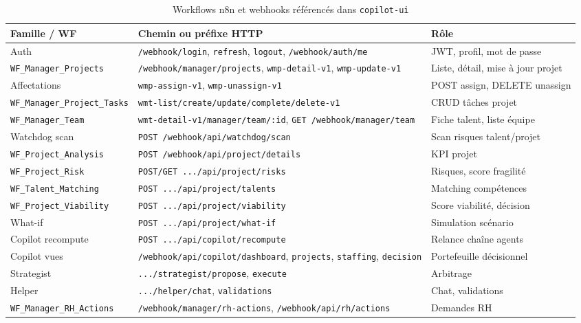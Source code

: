 \begin{table}[htbp]
\centering
\caption{Workflows n8n et webhooks référencés dans \texttt{copilot-ui}}
\label{tab:workflows-ch4}
\begin{tabular}{@{}p{2.5cm}p{4.8cm}p{5.7cm}@{}}
\toprule
\textbf{Famille / WF} & \textbf{Chemin ou préfixe HTTP} & \textbf{Rôle} \\
\midrule
Auth & \texttt{/webhook/login}, \texttt{refresh}, \texttt{logout}, \texttt{/webhook/auth/me} & JWT, profil, mot de passe \\
\texttt{WF\_Manager\_Projects} & \texttt{/webhook/manager/projects}, \texttt{wmp-detail-v1}, \texttt{wmp-update-v1} & Liste, détail, mise à jour projet \\
Affectations & \texttt{wmp-assign-v1}, \texttt{wmp-unassign-v1} & POST assign, DELETE unassign \\
\texttt{WF\_Manager\_Project\_Tasks} & \texttt{wmt-list/create/update/complete/delete-v1} & CRUD tâches projet \\
\texttt{WF\_Manager\_Team} & \texttt{wmt-detail-v1/manager/team/:id}, \texttt{GET /webhook/manager/team} & Fiche talent, liste équipe \\
Watchdog scan & \texttt{POST /webhook/api/watchdog/scan} & Scan risques talent/projet \\
\texttt{WF\_Project\_Analysis} & \texttt{POST /webhook/api/project/details} & KPI projet \\
\texttt{WF\_Project\_Risk} & \texttt{POST/GET .../api/project/risks} & Risques, score fragilité \\
\texttt{WF\_Talent\_Matching} & \texttt{POST .../api/project/talents} & Matching compétences \\
\texttt{WF\_Project\_Viability} & \texttt{POST .../api/project/viability} & Score viabilité, décision \\
What-if & \texttt{POST .../api/project/what-if} & Simulation scénario \\
Copilot recompute & \texttt{POST .../api/copilot/recompute} & Relance chaîne agents \\
Copilot vues & \texttt{/webhook/api/copilot/dashboard}, \texttt{projects}, \texttt{staffing}, \texttt{decision} & Portefeuille décisionnel \\
Strategist & \texttt{.../strategist/propose}, \texttt{execute} & Arbitrage \\
Helper & \texttt{.../helper/chat}, \texttt{validations} & Chat, validations \\
\texttt{WF\_Manager\_RH\_Actions} & \texttt{/webhook/manager/rh-actions}, \texttt{/webhook/api/rh/actions} & Demandes RH \\

\end{tabular}
\end{table}
